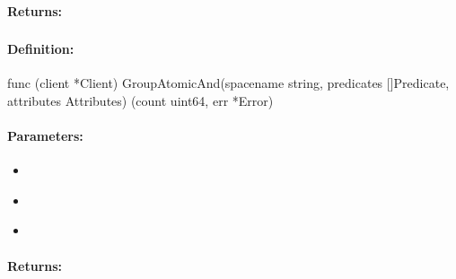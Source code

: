 \paragraph{Returns:}


\pagebreak
\subsubsection{}
\label{api:Go:GroupAtomicAnd}


\paragraph{Definition:}
\begin{gocode}
func (client *Client) GroupAtomicAnd(spacename string, predicates []Predicate, attributes Attributes) (count uint64, err *Error)
\end{gocode}

\paragraph{Parameters:}
\begin{itemize}[noitemsep]
\item {}\\

\item {}\\

\item {}\\

\end{itemize}

\paragraph{Returns:}


\pagebreak
\subsubsection{}
\label{api:Go:AtomicOr}


